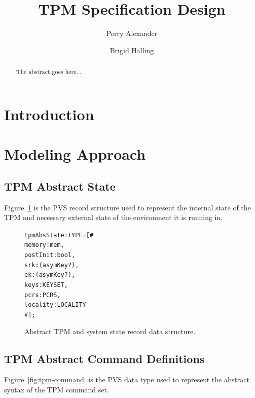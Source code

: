 \documentclass[10pt]{article}
\title{TPM Specification Design}
\author{Perry Alexander \and Brigid Halling}
\begin{document}
\maketitle
\tableofcontents
\listoffigures
\listoftables

\begin{abstract}
  The abstract goes here...
\end{abstract}

\section{Introduction}

\section{Modeling Approach}

\subsection{TPM Abstract State}

Figure~\ref{fig:tpm-abs-state} is the PVS record structure used to
represent the internal state of the TPM and necessary external state
of the environment it is running in.

\begin{figure}
\begin{alltt}
  tpmAbsState : TYPE = [#
                       memory : mem,
                       postInit : bool,
                       srk : (asymKey?),
                       ek : (asymKey?),
                       keys : KEYSET,
                       pcrs : PCRS,
                       locality : LOCALITY
                       #];
\end{alltt}
\caption{Abstract TPM and system state record data structure.}
\label{fig:tpm-abs-state}
\end{figure}

\subsection{TPM Abstract Command Definitions}

Figure~\ref{fig:tpm-command} is the PVS data type used to represent
the abstract syntax of the TPM command set.
\end{document}
